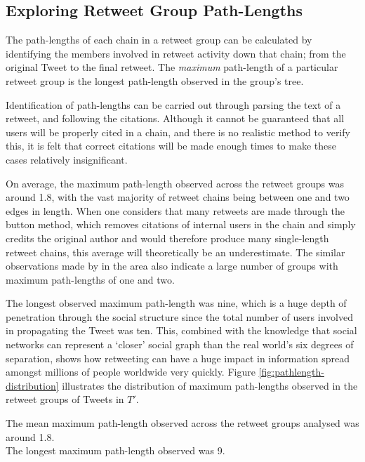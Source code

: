 \subsection{Exploring Retweet Group Path-Lengths}
\label{section:pathlength}
The path-lengths of each chain in a retweet group can be calculated by identifying the members involved in retweet activity down that chain; from the original Tweet to the final retweet. The \textit{maximum} path-length of a particular retweet group is the longest path-length observed in the group's tree.

Identification of path-lengths can be carried out through parsing the text of a retweet, and following the citations. Although it cannot be guaranteed that all users will be properly cited in a chain, and there is no realistic method to verify this, it is felt that correct citations will be made enough times to make these cases relatively insignificant.

On average, the maximum path-length observed across the retweet groups was around 1.8, with the vast majority of retweet chains being between one and two edges in length. When one considers that many retweets are made through the button method, which removes citations of internal users in the chain and simply credits the original author and would therefore produce many single-length retweet chains, this average will theoretically be an underestimate. The similar observations made by \citet{kwak10} in the area also indicate a large number of groups with maximum path-lengths of one and two.

The longest observed maximum path-length was nine, which is a huge depth of penetration through the social structure since the total number of users involved in propagating the Tweet was ten. This, combined with the knowledge that social networks can represent a `closer' social graph than the real world's six degrees of separation, shows how retweeting can have a huge impact in information spread amongst millions of people worldwide very quickly. Figure \ref{fig:pathlength-distribution} illustrates the distribution of maximum path-lengths observed in the retweet groups of Tweets in $T'$.

\begin{myobservation}
\label{observation:path-length}
The mean maximum path-length observed across the retweet groups analysed was around 1.8.\\
The longest maximum path-length observed was 9.
\end{myobservation}

